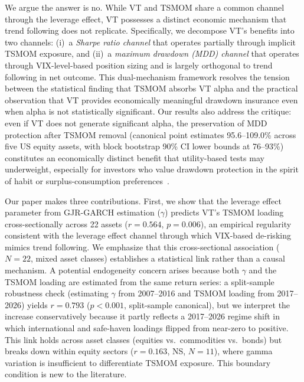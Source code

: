 We argue the answer is no. While VT and TSMOM share a common channel through the leverage effect, VT possesses a distinct economic mechanism that trend following does not replicate. Specifically, we decompose VT's benefits into two channels: (i)~a \textit{Sharpe ratio channel} that operates partially through implicit TSMOM exposure, and (ii)~a \textit{maximum drawdown (MDD) channel} that operates through VIX-level-based position sizing and is largely orthogonal to trend following in net outcome. This dual-mechanism framework resolves the tension between the statistical finding that TSMOM absorbs VT alpha and the practical observation that VT provides economically meaningful drawdown insurance even when alpha is not statistically significant. Our results also address the \citet{cederburg2020} critique: even if VT does not generate significant alpha, the preservation of MDD protection after TSMOM removal (canonical point estimates 95.6--109.0\% across five US equity assets, with block bootstrap 90\% CI lower bounds at 76--93\%) constitutes an economically distinct benefit that utility-based tests may underweight, especially for investors who value drawdown protection in the spirit of habit or surplus-consumption preferences~\citep{campbell1999}.

Our paper makes three contributions. First, we show that the leverage effect parameter from GJR-GARCH estimation ($\gamma$) predicts VT's TSMOM loading cross-sectionally across 22 assets ($r = 0.564$, $p = 0.006$), an empirical regularity consistent with the leverage effect channel through which VIX-based de-risking mimics trend following. We emphasize that this cross-sectional association ($N = 22$, mixed asset classes) establishes a statistical link rather than a causal mechanism. A potential endogeneity concern arises because both $\gamma$ and the TSMOM loading are estimated from the same return series: a split-sample robustness check (estimating $\gamma$ from 2007--2016 and TSMOM loading from 2017--2026) yields $r = 0.793$ ($p < 0.001$, split-sample canonical), but we interpret the increase conservatively because it partly reflects a 2017--2026 regime shift in which international and safe-haven loadings flipped from near-zero to positive. This link holds across asset classes (equities vs.\ commodities vs.\ bonds) but breaks down within equity sectors ($r = 0.163$, NS, $N = 11$), where gamma variation is insufficient to differentiate TSMOM exposure. This boundary condition is new to the literature.

